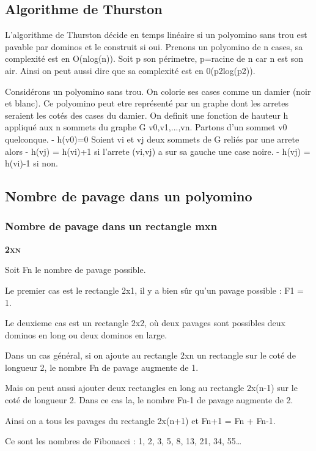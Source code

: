 \documentclass{article}
\begin{document}
\subsection{Algorithme de Thurston}

L'algorithme de Thurston décide en temps linéaire si un polyomino sans trou est pavable par dominos et le construit si oui.
Prenons un polyomino de n cases, sa complexité est en O(nlog(n)). Soit p son périmetre, p=racine de n car n est son air.
Ainsi on peut aussi dire que sa complexité est en 0(p2log(p2)).

Considérons un polyomino sans trou. On colorie ses cases comme un damier (noir et blanc). Ce polyomino peut etre représenté par un graphe dont les arretes seraient les cotés des cases du damier.
On definit une fonction de hauteur h appliqué aux n sommets du graphe G {v0,v1,...,vn}.
Partons d'un sommet v0 quelconque.
- h(v0)=0
Soient vi et vj deux sommets de G reliés par une arrete alors
- h(vj) = h(vi)+1 si l'arrete (vi,vj) a sur sa gauche une case noire.
- h(vj) = h(vi)-1 si non.

\subsection{Nombre de pavage dans un polyomino}

\subsubsection{Nombre de pavage dans un rectangle mxn}



\textbf{\textsc{2xn}}


Soit Fn le nombre de pavage possible.

Le premier cas est le rectangle 2x1, il y a bien sûr qu’un pavage possible : F1 = 1.

Le deuxieme cas est un rectangle 2x2, où deux pavages sont possibles deux dominos en long ou deux dominos en large.

Dans un cas général, si on ajoute au rectangle 2xn un rectangle sur le coté de longueur 2, le nombre Fn de pavage augmente de 1.

Mais on peut aussi ajouter deux rectangles en long au rectangle 2x(n-1) sur le coté de longueur 2. Dans ce cas la, le nombre Fn-1 de pavage augmente de 2.

Ainsi on a tous les pavages du rectangle 2x(n+1) et Fn+1 = Fn + Fn-1.

Ce sont les nombres de Fibonacci : 1, 2, 3, 5, 8, 13, 21, 34, 55…
\end{document}

